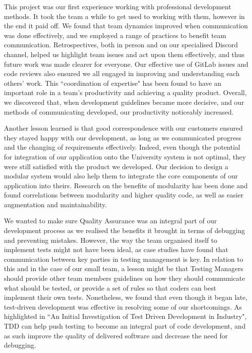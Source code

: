\documentclass{l3proj}
\begin{document}
This project was our first experience working with professional development methods. It took the team a while to get used to working with them, however in the end it paid off. We found that team dynamics improved when communication was done effectively, and we employed a range of practices to benefit team communication. Retrospectives, both in person and on our specialised Discord channel, helped us highlight team issues and act upon them effectively, and thus future work was made clearer for everyone. Our effective use of GitLab issues and code reviews also ensured we all engaged in improving and understanding each others' work. This ``coordination of expertise" has been found to have an important role in a team's productivity and achieving a quality product\cite{teamwork:Weimar}. Overall, we discovered that, when development guidelines became more decisive, and our methods of communicating developed, our productivity noticeably increased.

Another lesson learned is that good correspondence with our customers ensured they stayed happy with our development, as long as we communicated progress and the changing of requirements effectively. Indeed, even though the potential for integration of our application onto the University system is not optimal, they were still satisfied with the product we developed. Our decision to design a modular system would also help them to integrate the core components of our application into theirs. Research on the benefits of modularity has been done and found correlations between modularity and higher quality code, as well as easier augmentation and maintainability\cite{modularity:Woude, modularity:MacCormarck}.

We wanted to make sure Quality Assurance was an integral part of our development process as we realised the benefits it brought in terms of debugging and preventing mistakes. However, the way the team organised itself to implement tests might not have been ideal, as case studies have found that communication between key parties in testing management is key\cite{test:Parveen}. In relation to this and in the case of our small team, a lesson might be that Testing Managers should provide other team members guidelines on how they should communicate what should be tested, or provide a set of rules so that coders can best implement their own tests.
Nonetheless, we found that even though it began late, test-driven development was effective in resolving some of our shortcomings. As highlighted in ``An Initial Investigation of Test Driven Development in Industry", TDD can help push testing to become an integral part of code development\cite{tdd:George}, and as such improve the quality of delivered software and decrease the need for debugging.
\end{document}
